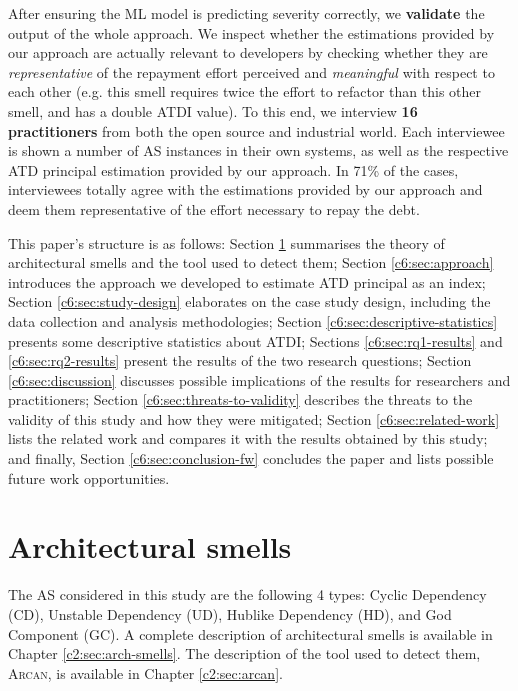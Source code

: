 After ensuring the ML model is predicting severity correctly, we \textbf{validate} the output of the whole approach. 
We inspect whether the estimations provided by our approach are actually relevant to developers by checking whether they are \emph{representative} of the repayment effort perceived and \emph{meaningful} with respect to each other (e.g. this smell requires twice the effort to refactor than this other smell, and has a double ATDI value).
To this end, we interview \textbf{16 practitioners} from both the open source and industrial world.
Each interviewee is shown a number of AS instances in their own systems, as well as the respective ATD principal estimation provided by our approach.
In 71\% of the cases, interviewees totally agree with the estimations provided by our approach and deem them representative of the effort necessary to repay the debt.

This paper's structure is as follows:
Section \ref{c6:sec:AS} summarises the theory of architectural smells and the tool used to detect them; Section \ref{c6:sec:approach} introduces the approach we developed to estimate ATD principal as an index; Section \ref{c6:sec:study-design} elaborates on the case study design, including the data collection and analysis methodologies; Section \ref{c6:sec:descriptive-statistics} presents some descriptive statistics about ATDI; Sections \ref{c6:sec:rq1-results} and \ref{c6:sec:rq2-results}  present the results of the two research questions; Section \ref{c6:sec:discussion} discusses possible implications of the results for researchers and practitioners; Section \ref{c6:sec:threats-to-validity} describes the threats to the validity of this study and how they were mitigated; Section \ref{c6:sec:related-work} lists the related work and compares it with the results obtained by this study; and finally, Section \ref{c6:sec:conclusion-fw} concludes the paper and lists possible future work opportunities.


\section{Architectural smells}\label{c6:sec:AS}
The AS considered in this study are the following 4 types: Cyclic Dependency (CD), Unstable Dependency (UD), Hublike Dependency (HD), and God Component (GC).
A complete description of architectural smells is available in Chapter \ref{c2:sec:arch-smells}.
The description of the tool used to detect them, \textsc{Arcan}, is available in Chapter \ref{c2:sec:arcan}.

